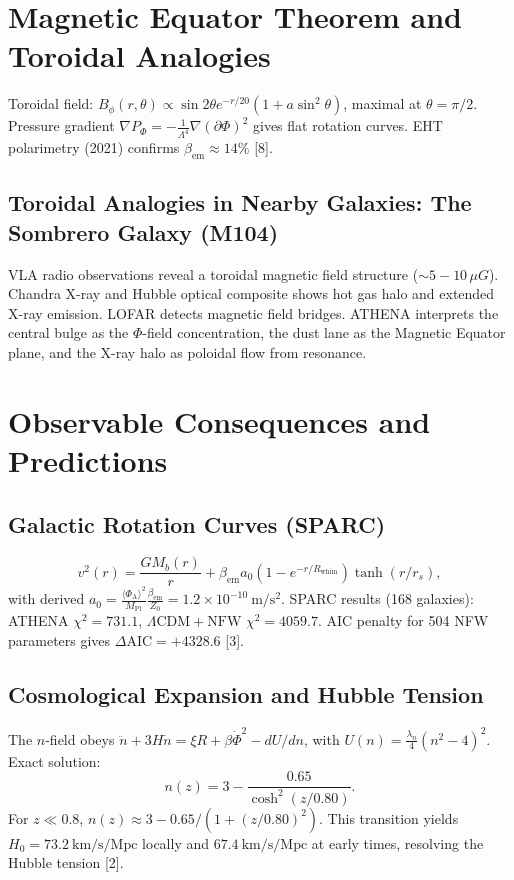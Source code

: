 \documentclass[12pt, a4paper]{article}
\begin{document}
\section{Magnetic Equator Theorem and Toroidal Analogies}
\label{sec:magnetic}
Toroidal field: $B_{\phi}(r,\theta)\propto \sin 2\theta e^{- r / 20}(1 + a\sin^{2}\theta)$, maximal at $\theta = \pi /2$. Pressure gradient $\nabla P_{\Phi} = - \frac{1}{\Lambda^{4}}\nabla (\partial \Phi)^{2}$ gives flat rotation curves. EHT polarimetry (2021) confirms $\beta_{\mathrm{em}}\approx 14\%$ [8].

\subsection{Toroidal Analogies in Nearby Galaxies: The Sombrero Galaxy (M104)}
VLA radio observations reveal a toroidal magnetic field structure ($\sim 5-10\,\mu G$). Chandra X-ray and Hubble optical composite shows hot gas halo and extended X-ray emission. LOFAR detects magnetic field bridges. ATHENA interprets the central bulge as the $\Phi$-field concentration, the dust lane as the Magnetic Equator plane, and the X-ray halo as poloidal flow from resonance.

\section{Observable Consequences and Predictions}
\label{sec:obs}

\subsection{Galactic Rotation Curves (SPARC)}
\begin{equation}
v^{2}(r) = \frac{GM_{b}(r)}{r} +\beta_{\mathrm{em}}a_{0}\left(1 - e^{-r / R_{\mathrm{whim}}}\right)\tanh (r / r_{s}),
\end{equation}
with derived $a_{0} = \frac{\langle \Phi_{\mathrm{A}}\rangle^{2}}{M_{\mathrm{Pl}}}\frac{\beta_{\mathrm{em}}}{Z_{0}} = 1.2\times 10^{- 10}\ \mathrm{m/s^{2}}$. SPARC results (168 galaxies): ATHENA $\chi^{2} = 731.1$, $\Lambda \mathrm{CDM} + \mathrm{NFW}$ $\chi^{2} = 4059.7$. AIC penalty for 504 NFW parameters gives $\Delta \mathrm{AIC} = +4328.6$ [3].

\subsection{Cosmological Expansion and Hubble Tension}
The $n$-field obeys $\ddot{n} + 3H\dot{n} = \xi R + \beta \dot{\Phi}^{2} - dU / dn$, with $U(n) = \frac{\lambda_{n}}{4} (n^{2} - 4)^{2}$. Exact solution:
\begin{equation}
n(z) = 3 - \frac{0.65}{\cosh^2(z / 0.80)}.
\end{equation}
For $z\ll 0.8$, $n(z)\approx 3 - 0.65 / (1 + (z / 0.80)^2)$. This transition yields $H_{0} = 73.2\ \mathrm{km/s/Mpc}$ locally and $67.4\ \mathrm{km/s/Mpc}$ at early times, resolving the Hubble tension [2].
\end{document}

